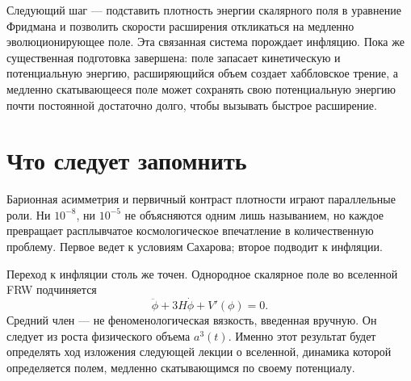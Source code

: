 Следующий шаг — подставить плотность энергии скалярного поля в уравнение Фридмана и позволить скорости расширения откликаться на медленно эволюционирующее поле. Эта связанная система порождает инфляцию. Пока же существенная подготовка завершена: поле запасает кинетическую и потенциальную энергию, расширяющийся объем создает хаббловское трение, а медленно скатывающееся поле может сохранять свою потенциальную энергию почти постоянной достаточно долго, чтобы вызывать быстрое расширение.

\section{Что следует запомнить}

Барионная асимметрия и первичный контраст плотности играют параллельные роли. Ни \(10^{-8}\), ни \(10^{-5}\) не объясняются одним лишь называнием, но каждое превращает расплывчатое космологическое впечатление в количественную проблему. Первое ведет к условиям Сахарова; второе подводит к инфляции.

Переход к инфляции столь же точен. Однородное скалярное поле во вселенной FRW подчиняется
\[
\ddot\phi+3H\dot\phi+V'(\phi)=0.
\]
Средний член — не феноменологическая вязкость, введенная вручную. Он следует из роста физического объема \(a^3(t)\). Именно этот результат будет определять ход изложения следующей лекции о вселенной, динамика которой определяется полем, медленно скатывающимся по своему потенциалу.
